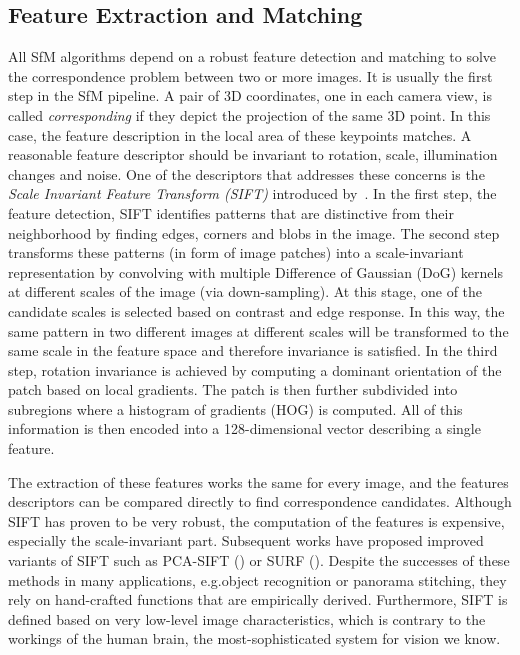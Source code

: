 		\subsection{Feature Extraction and Matching}
			All SfM algorithms depend on a robust feature detection and matching to solve the correspondence problem between two or more images.
			It is usually the first step in the SfM pipeline.
			A pair of 3D coordinates, one in each camera view, is called \emph{corresponding} if they depict the projection of the same 3D point.
			In this case, the feature description in the local area of these keypoints matches.
			A reasonable feature descriptor should be invariant to rotation, scale, illumination changes and noise.
			One of the descriptors that addresses these concerns is the \emph{Scale Invariant Feature Transform (SIFT)} introduced by~\cite{lowe1999object}.
			In the first step, the feature detection, SIFT identifies patterns that are distinctive from their neighborhood by finding edges, corners and blobs in the image.
			The second step transforms these patterns (in form of image patches) into a scale-invariant representation by convolving with multiple Difference of Gaussian (DoG) kernels at different scales of the image (via down-sampling).
			At this stage, one of the candidate scales is selected based on contrast and edge response.
			In this way, the same pattern in two different images at different scales will be transformed to the same scale in the feature space and therefore invariance is satisfied.
			In the third step, rotation invariance is achieved by computing a dominant orientation of the patch based on local gradients.
			The patch is then further subdivided into subregions where a histogram of gradients (HOG) is computed.
			All of this information is then encoded into a 128-dimensional vector describing a single feature.
			
			The extraction of these features works the same for every image, and the features descriptors can be compared directly to find correspondence candidates.
			Although SIFT has proven to be very robust, the computation of the features is expensive, especially the scale-invariant part.
			Subsequent works have proposed improved variants of SIFT such as PCA-SIFT (\cite{ke2004pca}) or SURF (\cite{bay2006surf}).
			Despite the successes of these methods in many applications, e.g.\@ object recognition or panorama stitching, they rely on hand-crafted functions that are empirically derived.
			Furthermore, SIFT is defined based on very low-level image characteristics, which is contrary to the workings of the human brain, the most-sophisticated system for vision we know.
			
